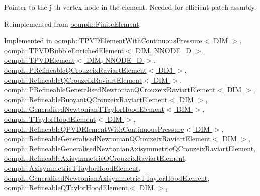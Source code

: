 Pointer to the j-\/th vertex node in the element. Needed for efficient patch assmbly. 



Reimplemented from \hyperlink{classoomph_1_1FiniteElement_a863c4382c879a77ad5607c6f9781c761}{oomph\+::\+Finite\+Element}.



Implemented in \hyperlink{classoomph_1_1TPVDElementWithContinuousPressure_a24200726cc04eec0150070d8a223ae8f}{oomph\+::\+T\+P\+V\+D\+Element\+With\+Continuous\+Pressure$<$ D\+I\+M $>$}, \hyperlink{classoomph_1_1TPVDBubbleEnrichedElement_a9ac6a29cd04c36787db97bc1c1c540e9}{oomph\+::\+T\+P\+V\+D\+Bubble\+Enriched\+Element$<$ D\+I\+M, N\+N\+O\+D\+E\+\_\+D $>$}, \hyperlink{classoomph_1_1TPVDElement_a3251ad69f6f52975c923120e06487217}{oomph\+::\+T\+P\+V\+D\+Element$<$ D\+I\+M, N\+N\+O\+D\+E\+\_\+D $>$}, \hyperlink{classoomph_1_1PRefineableQCrouzeixRaviartElement_a0a0d25592c0b9b04505fbd0b3bb4fb22}{oomph\+::\+P\+Refineable\+Q\+Crouzeix\+Raviart\+Element$<$ D\+I\+M $>$}, \hyperlink{classoomph_1_1RefineableQCrouzeixRaviartElement_a0065d45089ddd4c632da34e1eb9e2b63}{oomph\+::\+Refineable\+Q\+Crouzeix\+Raviart\+Element$<$ D\+I\+M $>$}, \hyperlink{classoomph_1_1PRefineableGeneralisedNewtonianQCrouzeixRaviartElement_ae2fe7e53f670c3bbe10bfd505ff0e198}{oomph\+::\+P\+Refineable\+Generalised\+Newtonian\+Q\+Crouzeix\+Raviart\+Element$<$ D\+I\+M $>$}, \hyperlink{classoomph_1_1RefineableBuoyantQCrouzeixRaviartElement_a39d79b2fe742148c2d3856ed05ad78db}{oomph\+::\+Refineable\+Buoyant\+Q\+Crouzeix\+Raviart\+Element$<$ D\+I\+M $>$}, \hyperlink{classoomph_1_1GeneralisedNewtonianTTaylorHoodElement_a9de1770248ec1624dcb594f2116f7274}{oomph\+::\+Generalised\+Newtonian\+T\+Taylor\+Hood\+Element$<$ D\+I\+M $>$}, \hyperlink{classoomph_1_1TTaylorHoodElement_a3275ab39f68ac0db35dc31bce6b0bdf5}{oomph\+::\+T\+Taylor\+Hood\+Element$<$ D\+I\+M $>$}, \hyperlink{classoomph_1_1RefineableQPVDElementWithContinuousPressure_a9afc4605536e3f3a637ae1694c0d9065}{oomph\+::\+Refineable\+Q\+P\+V\+D\+Element\+With\+Continuous\+Pressure$<$ D\+I\+M $>$}, \hyperlink{classoomph_1_1RefineableGeneralisedNewtonianQCrouzeixRaviartElement_a5c5acb0207b889707b138eec04b2b94d}{oomph\+::\+Refineable\+Generalised\+Newtonian\+Q\+Crouzeix\+Raviart\+Element$<$ D\+I\+M $>$}, \hyperlink{classoomph_1_1RefineableGeneralisedNewtonianAxisymmetricQCrouzeixRaviartElement_ab40a282339a7f9238f88de7f88654f15}{oomph\+::\+Refineable\+Generalised\+Newtonian\+Axisymmetric\+Q\+Crouzeix\+Raviart\+Element}, \hyperlink{classoomph_1_1RefineableAxisymmetricQCrouzeixRaviartElement_a9d6988c1e72c26c9279dad476eb5cdde}{oomph\+::\+Refineable\+Axisymmetric\+Q\+Crouzeix\+Raviart\+Element}, \hyperlink{classoomph_1_1AxisymmetricTTaylorHoodElement_a44d3195ac5946d8ea71ea5fe98120605}{oomph\+::\+Axisymmetric\+T\+Taylor\+Hood\+Element}, \hyperlink{classoomph_1_1GeneralisedNewtonianAxisymmetricTTaylorHoodElement_a161e0372d0a130c4c4ca2edc9abaa355}{oomph\+::\+Generalised\+Newtonian\+Axisymmetric\+T\+Taylor\+Hood\+Element}, \hyperlink{classoomph_1_1RefineableQTaylorHoodElement_a311748123de5fa1d68c294d4b8519fbb}{oomph\+::\+Refineable\+Q\+Taylor\+Hood\+Element$<$ D\+I\+M $>$}, 